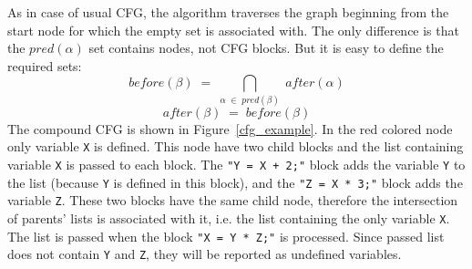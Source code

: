 As in case of usual CFG, the algorithm traverses the graph beginning from the start node for which the empty set is associated with. The only difference is that the $pred(\alpha)$ set contains nodes, not CFG blocks. But it is easy to define the required sets:
$$
before (\beta) \;=\; \bigcap_{\alpha \;\in\; pred(\beta)} \;after(\alpha)
$$
$$
after (\beta) \;=\; before (\beta)
$$
The compound CFG is shown in Figure~\ref{cfg_example}. In the red colored node only variable \verb|X| is defined. This node have two child blocks and the list containing variable \verb|X| is passed to each block. The \verb|"Y = X + 2;"| block adds the variable \verb|Y| to the list (because \verb|Y| is defined in this block), and the \verb|"Z = X * 3;"| block adds the variable \verb|Z|. These two blocks have the same child node, therefore the intersection of parents' lists is associated with it, i.e. the list containing the only variable \verb|X|. The list is passed when the block \verb|"X = Y * Z;"| is processed. Since passed list does not contain \verb|Y| and \verb|Z|, they will be reported as undefined variables.
